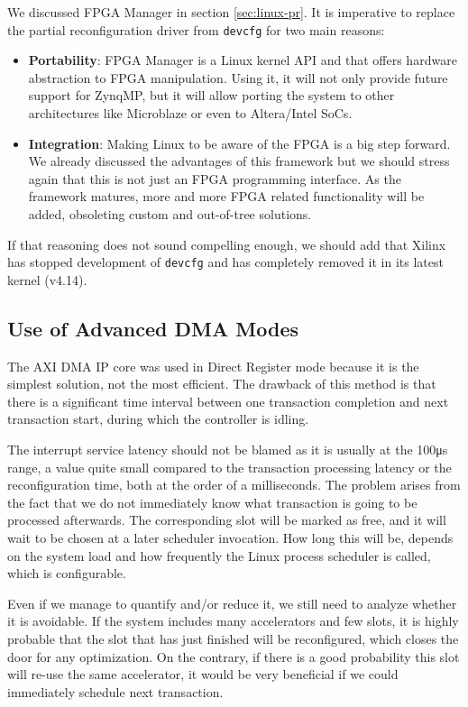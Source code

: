 We discussed FPGA Manager in section \ref{sec:linux-pr}. 
It is imperative to replace the partial reconfiguration driver from \texttt{devcfg} for two main reasons:

\begin{itemize}
\item	\textbf{Portability}: FPGA Manager is a Linux kernel API and that offers hardware abstraction to
	FPGA manipulation.
	Using it, it will not only provide future support for ZynqMP, but it will allow porting the system
	to other architectures like Microblaze or even to Altera/Intel SoCs.
\item	\textbf{Integration}: Making Linux to be aware of the FPGA is a big step forward.
	We already discussed the advantages of this framework but we should stress again that this is not just
	an FPGA programming interface. 
	As the framework matures, more and more FPGA related functionality will be added, 
	obsoleting custom and out-of-tree solutions.
\end{itemize}

If that reasoning does not sound compelling enough, 
we should add that Xilinx has stopped development of \texttt{devcfg} and has 
completely removed it in its latest kernel (v4.14).

\subsection{Use of Advanced DMA Modes}

The AXI DMA IP core was used in Direct Register mode because it is the simplest solution, not the most efficient.
The drawback of this method is that there is a significant time interval between 
one transaction completion and next transaction start, during which the controller is idling. 

The interrupt service latency should not be blamed as it is usually at the 100μs range,
a value quite small compared to the transaction processing latency or the reconfiguration time,
both at the order of a milliseconds. The problem arises from the fact that we do not immediately
know what transaction is going to be processed afterwards. The corresponding slot will be marked as free,
and it will wait to be chosen at a later scheduler invocation. How long this will be, depends on the system
load and how frequently the Linux process scheduler is called, which is configurable.

Even if we manage to quantify and/or reduce it, we still need to analyze whether it is avoidable.
If the system includes many accelerators and few slots, it is highly probable that the slot that has just finished
will be reconfigured, which closes the door for any optimization. On the contrary, if there is a good probability
this slot will re-use the same accelerator, it would be very beneficial if we could immediately schedule next transaction.

